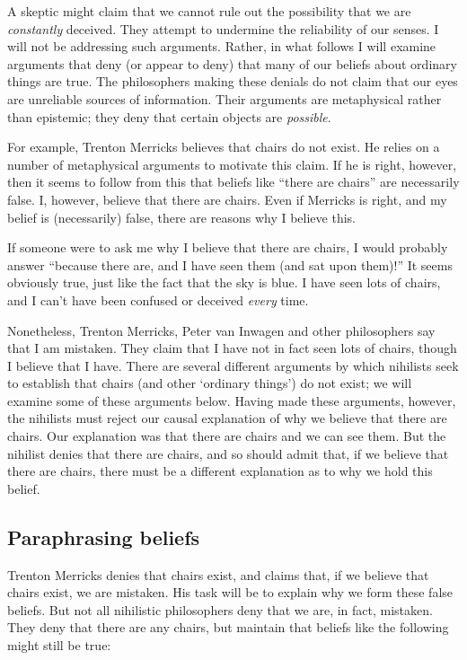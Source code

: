 \documentclass[11pt]{article}
\begin{document}
\begin{spacing}{1.5}
A skeptic might claim that we cannot rule out the possibility that we
are {\em constantly} deceived.  They attempt to undermine the
reliability of our senses.  I will not be addressing such arguments.
Rather, in what follows I will examine arguments that deny (or appear
to deny) that many of our beliefs about ordinary things are true.  The
philosophers making these denials do not claim that our eyes are
unreliable sources of information.  Their arguments are metaphysical
rather than epistemic; they deny that certain objects are {\em
  possible}.

For example, Trenton Merricks believes that chairs do not exist.  He
relies on a number of metaphysical arguments to motivate this claim.
If he is right, however, then it seems to follow from this that
beliefs like ``there are chairs'' are necessarily false.  I, however,
believe that there are chairs.  Even if Merricks is right, and my
belief is (necessarily) false, there are reasons why I believe this.

If someone were to ask me why I believe that there are chairs, I would
probably answer ``because there are, and I have seen them (and sat
upon them)!''  It seems obviously true, just like the fact that the
sky is blue.  I have seen lots of chairs, and I can't have been
confused or deceived {\em every} time.

Nonetheless, Trenton Merricks, Peter van Inwagen and other
philosophers say that I am mistaken.  They claim that I have not in
fact seen lots of chairs, though I believe that I have.  There are
several different arguments by which nihilists seek to establish that
chairs (and other `ordinary things') do not exist; we will examine
some of these arguments below.  Having made these arguments, however,
the nihilists must reject our causal explanation of why we believe
that there are chairs.  Our explanation was that there are chairs and
we can see them.  But the nihilist denies that there are chairs, and
so should admit that, if we believe that there are chairs, there must
be a different explanation as to why we hold this belief.

\subsection{Paraphrasing beliefs}
\label{paraphrase}
Trenton Merricks denies that chairs exist, and claims that, if we
believe that chairs exist, we are mistaken.  His task will be to
explain why we form these false beliefs.  But not all nihilistic
philosophers deny that we are, in fact, mistaken.  They deny that
there are any chairs, but maintain that beliefs like the following
might still be true:


\end{spacing}
\end{document}
